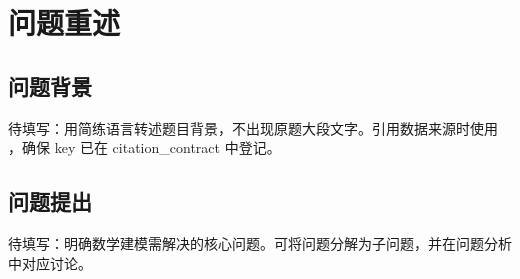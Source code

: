 \section{问题重述}\label{sec:problem}

\subsection{问题背景}
待填写：用简练语言转述题目背景，不出现原题大段文字。引用数据来源时使用 \cite{key}，确保 key 已在 citation_contract 中登记。

\subsection{问题提出}
待填写：明确数学建模需解决的核心问题。可将问题分解为子问题，并在问题分析中对应讨论。
